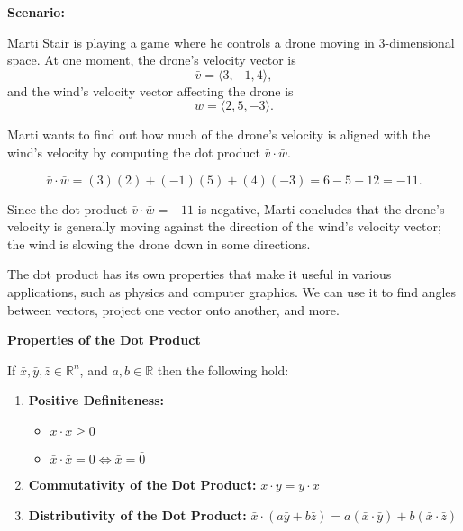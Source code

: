 \begin{examplebox}
  \textbf{Scenario:}

Marti Stair is playing a game where he controls a drone moving in 3-dimensional space. At one moment, the drone's velocity vector is
\[
\bar{v} = \langle 3, -1, 4 \rangle,
\]
and the wind's velocity vector affecting the drone is
\[
\bar{w} = \langle 2, 5, -3 \rangle.
\]

Marti wants to find out how much of the drone's velocity is aligned with the wind's velocity by computing the dot product \(\bar{v} \cdot \bar{w}\).

\[
\bar{v} \cdot \bar{w} = (3)(2) + (-1)(5) + (4)(-3) = 6 - 5 - 12 = -11.
\]

Since the dot product \(\bar{v} \cdot \bar{w} = -11\) is negative, Marti concludes that the drone's velocity is generally moving against the direction of the wind's velocity vector; the wind is slowing the drone down in some directions.

\end{examplebox}
The dot product has its own properties that make it useful in various applications, such as physics and computer graphics.
We can use it to find angles between vectors, project one vector onto another, and more.
\begin{theorembox}
\textbf{Properties of the Dot Product}

If $\bar{x}, \bar{y}, \bar{z} \in \mathbb{R}^n$, and $a, b \in \mathbb{R}$ then the following hold:
\begin{enumerate}
\item \textbf{Positive Definiteness:}
\begin{itemize}
\item $\bar{x} \cdot \bar{x} \geq 0$
\item $\bar{x} \cdot \bar{x} = 0 \Leftrightarrow \bar{x} = \bar{0}$
\end{itemize}
\item \textbf{Commutativity of the Dot Product:} $\bar{x} \cdot \bar{y} = \bar{y} \cdot \bar{x}$
\item \textbf{Distributivity of the Dot Product:} $\bar{x} \cdot (a\bar{y} + b\bar{z}) = a(\bar{x} \cdot \bar{y}) + b(\bar{x} \cdot \bar{z})$
\end{enumerate}
\end{theorembox}




